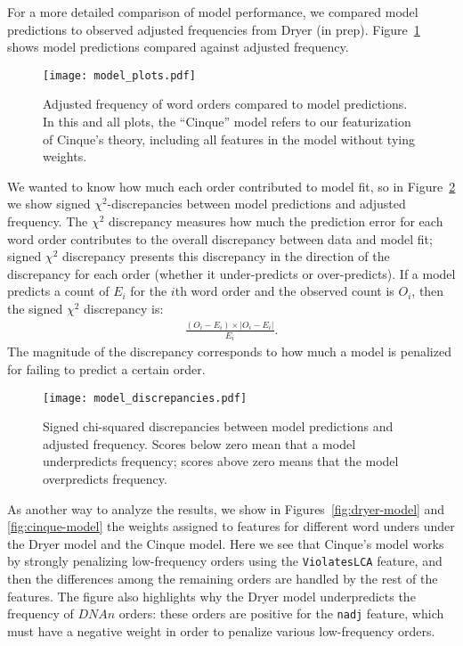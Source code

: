 \documentclass[11pt]{article}
\begin{document}
For a more detailed comparison of model performance, we compared model predictions to observed adjusted frequencies from Dryer (in prep). Figure~\ref{fig:af-predictions} shows model predictions compared against adjusted frequency.

\begin{figure}[ht!]
  \centering
  \texttt{[image: model\_plots.pdf]}
  \caption{Adjusted frequency of word orders compared to model predictions. In this and all plots, the ``Cinque'' model refers to our featurization of Cinque's theory, including all features in the model without tying weights.}
  \label{fig:af-predictions}
\end{figure}


We wanted to know how much each order contributed to model fit, so in Figure~\ref{fig:af-discrepancies} we show signed $\chi^2$-discrepancies between model predictions and adjusted frequency. The $\chi^2$ discrepancy measures how much the prediction error for each word order contributes to the overall discrepancy between data and model fit; signed $\chi^2$ discrepancy presents this discrepancy in the direction of the discrepancy for each order (whether it under-predicts or over-predicts).
If a model predicts a count of $E_i$ for the $i$th word order and the observed count is $O_i$, then the signed $\chi^2$ discrepancy is:
\begin{align}
  \nonumber
  \frac{(O_i - E_i) \times |O_i - E_i|}
       {E_i}.
\end{align}
The magnitude of the discrepancy corresponds to how much a model is penalized for failing to predict a certain order.

\begin{figure}[ht!]
  \centering
  \texttt{[image: model\_discrepancies.pdf]}
  \caption{Signed chi-squared discrepancies between model predictions and adjusted frequency. Scores below zero mean that a model underpredicts frequency; scores above zero means that the model overpredicts frequency.}
  \label{fig:af-discrepancies}
\end{figure}

As another way to analyze the results, we show in Figures~\ref{fig:dryer-model} and \ref{fig:cinque-model} the weights assigned to features for different word unders under the Dryer model and the Cinque model.
Here we see that Cinque's model works by strongly penalizing low-frequency orders using the \texttt{ViolatesLCA} feature, and then the differences among the remaining orders are handled by the rest of the features.
The figure also highlights why the Dryer model underpredicts the frequency of $DNAn$ orders: these orders are positive for the \texttt{nadj} feature, which must have a negative weight in order to penalize various low-frequency orders.
\end{document}
